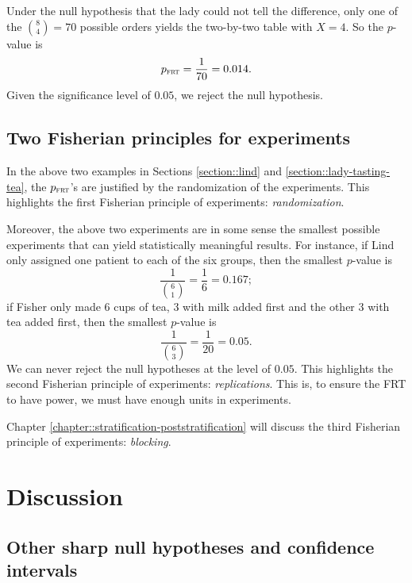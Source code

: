 Under the null hypothesis that the lady could not tell the difference, only one of the $\binom{8}{4} = 70$ possible orders yields the two-by-two table with $X=4$. So the $p$-value is
$$
p_{\textsc{frt}} = \frac{1}{70} = 0.014.
$$
Given the significance level of $0.05$, we reject the null hypothesis. 



\subsection{Two Fisherian principles for experiments}\label{sec::fisherian-principles-experiments}


In the above two examples in Sections \ref{section::lind} and \ref{section::lady-tasting-tea}, the $p_{\textsc{frt}}$'s are justified by the randomization of the experiments. This highlights the first Fisherian principle of experiments: {\it randomization}.




 
 
 


Moreover, the above two experiments are in some sense the smallest possible experiments that can yield statistically meaningful results. For instance, if Lind only assigned one patient to each of the six groups, then the smallest $p$-value is
$$
\frac{1}{\binom{6}{1}}  =\frac{1}{6} = 0.167;
$$
if Fisher only made $6$ cups of tea, $3$ with milk added first and the other $3$ with tea added first, then the smallest $p$-value is
$$
\frac{1}{\binom{6}{3}} = \frac{1}{20} = 0.05.
$$
We can never reject the null hypotheses at the level of $0.05$. This highlights the second Fisherian principle of experiments: {\it replications}. This is, to ensure the FRT to have power, we must have enough units in experiments. 

 

Chapter \ref{chapter::stratification-poststratification} will discuss the third Fisherian principle of experiments: {\it blocking}.


 

 

\section{Discussion}

\subsection{Other sharp null hypotheses and confidence intervals}\label{sec::frt-invert-interval}


